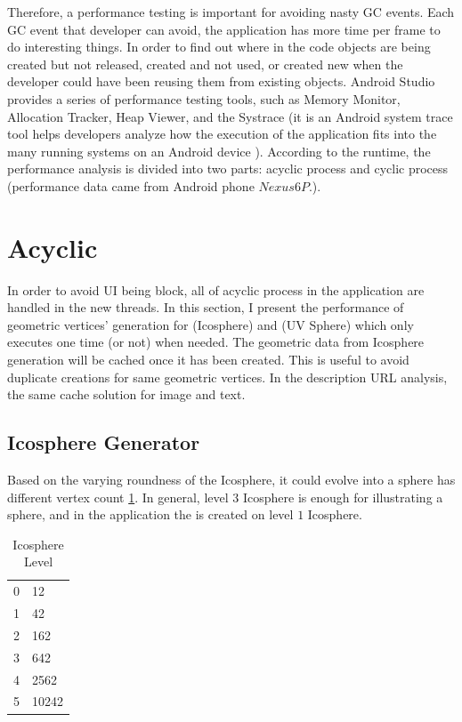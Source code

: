 Therefore, a performance testing is important for avoiding nasty GC events. Each GC event that developer can avoid, the application has more time per frame to do interesting things. In order to find out where in the code objects are being created but not released, created and not used, or created new when the developer could have been reusing them from existing objects. Android Studio provides a series of performance testing tools, such as Memory Monitor, Allocation Tracker, Heap Viewer, and the Systrace (it is an Android system trace tool helps developers analyze how the execution of the application fits into the many running systems on an Android device \cite{google.systrace.2016}). According to the runtime, the performance analysis is divided into two parts: acyclic process and cyclic process (performance data came from Android phone $Nexus 6P$.).

\section{Acyclic}

In order to avoid UI being block, all of acyclic process in the application are handled in the new threads. In this section, I present the performance of geometric vertices' generation for  (Icosphere) and  (UV Sphere) which only executes one time (or not) when needed. The geometric data from Icosphere generation will be cached once it has been created. This is useful to avoid duplicate creations for same geometric vertices. In the  description URL analysis, the same cache solution for image and text.

\subsection{Icosphere Generator}

Based on the varying roundness of the Icosphere, it could evolve into a sphere has different vertex count \ref{tab:icosphere-level}. In general, level $3$ Icosphere is enough for illustrating a sphere, and in the application the  is created on level $1$ Icosphere.

\begin{table}[H]
	\caption{Icosphere Level}
	\label{tab:icosphere-level}
	\centering
	\begin{tabular}{l l}
		\toprule
		\tabhead{Recursion Level} & \tabhead{Vertex Count}\\
		\midrule
		0 & 12\\
		1 & 42\\
		2 & 162\\
		3 & 642\\
		4 & 2562\\
		5 & 10242\\
		\bottomrule
	\end{tabular}
\end{table}

